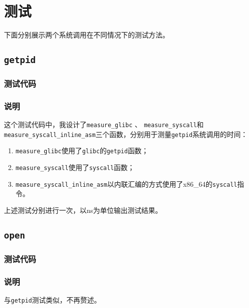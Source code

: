 \section{测试}

下面分别展示两个系统调用在不同情况下的测试方法。

\subsection{{\tt getpid}}

\subsubsection{测试代码}



\subsubsection{说明}

这个测试代码中，我设计了{\tt measure\_glibc} 、 {\tt measure\_syscall}和{\tt measure\_syscall\_inline\_asm}三个函数，分别用于测量{\tt getpid}系统调用的时间：

\begin{enumerate}
    \item {\tt measure\_glibc}使用了{\tt glibc}的{\tt getpid}函数；
    \item {\tt measure\_syscall}使用了{\tt syscall}函数；
    \item {\tt measure\_syscall\_inline\_asm}以内联汇编的方式使用了x86\_64的{\tt syscall}指令。
\end{enumerate}

上述测试分别进行一次，以ns为单位输出测试结果。


\subsection{{\tt open}}

\subsubsection{测试代码}



\subsubsection{说明}

与{\tt getpid}测试类似，不再赘述。
